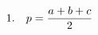 \documentclass[preview]{standalone}
\begin{document}
\begin{align*}
\special{dvisvgm:raw <g id='unique000'>}1.\quad p = \frac{a+b+c}{2}\special{dvisvgm:raw </g>}
\end{align*}
\end{document}
